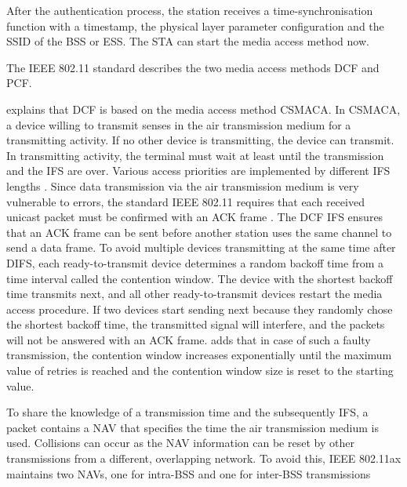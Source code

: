 After the authentication process, the station receives a time-synchronisation function with a timestamp, the physical layer
parameter configuration and the \ac{SSID} of the \ac{BSS} or \ac{ESS}.
The \ac{STA} can start the media access method now.

The IEEE 802.11 standard describes the two media access methods \ac{DCF} and \ac{PCF}.

\textcite{sauter_wireless_2022} explains that \ac{DCF} is based on the media access method \ac{CSMACA}.
In \ac{CSMACA}, a device willing to transmit senses in the air transmission medium for a transmitting activity.
If no other device is transmitting, the device can transmit.
In transmitting activity, the terminal must wait at least until the transmission and the \ac{IFS} are over.
Various access priorities are implemented by different \ac{IFS} lengths \cite{sommer_vehicular_2014}.
Since data transmission via the air transmission medium is very vulnerable to errors,
the standard IEEE 802.11 requires that each received unicast packet must be confirmed with an \ac{ACK} frame \cite{sommer_vehicular_2014}.
The \ac{DCF} \ac{IFS} ensures that an \ac{ACK} frame can be sent before another station uses the same channel to send a data frame.
To avoid multiple devices transmitting at the same time after \ac{DIFS}, each ready-to-transmit device determines
a random backoff time from a time interval called the contention window.
The device with the shortest backoff time transmits next, and all other ready-to-transmit devices restart the media access procedure.
If two devices start sending next because they randomly chose the shortest backoff time,
the transmitted signal will interfere, and the packets will not be answered with an \ac{ACK} frame.
\textcite{sommer_vehicular_2014} adds that in case of such a faulty transmission, the contention window increases exponentially until the maximum value of retries is reached and
the contention window size is reset to the starting value.

To share the knowledge of a transmission time and the subsequently \ac{IFS}, a packet contains a \ac{NAV} that
specifies the time the air transmission medium is used.
Collisions can occur as the \ac{NAV} information can be reset by other transmissions from a different, overlapping network.
To avoid this, IEEE 802.11ax maintains two \ac{NAV}s, one for intra-\ac{BSS} and one for inter-\ac{BSS} transmissions \cite{noauthor_ieee_2021}

